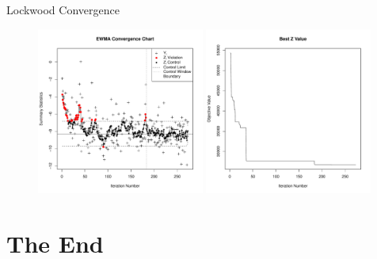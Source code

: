 \documentclass[ xcolor = pdftex, dvipsnames, table ]{beamer}
\begin{document}
\begin{frame}{Lockwood Convergence}
\begin{figure}[h!]%
        \includegraphics[width=0.49\textwidth]{ewmaConvChartLock6Three20000End.pdf}
        \includegraphics[width=0.49\textwidth]{bestZLock6Three20000End.pdf}
\end{figure}
\end{frame}

\section{The End}
\end{document}

